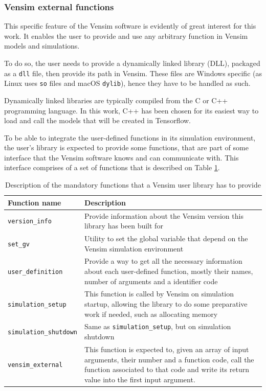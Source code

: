\subsubsection{Vensim external functions}

This specific feature of the Vensim software is evidently of great interest for this work. It enables the user to provide and use any arbitrary function in Vensim models and simulations.

To do so, the user needs to provide a dynamically linked library (DLL), packaged as a \texttt{dll} file, then provide its path in Vensim. These files are Windows specific (as Linux uses \texttt{so} files and macOS \texttt{dylib}), hence they have to be handled as such.

Dynamically linked libraries are typically compiled from the C or C++ programming language. In this work, C++ has been chosen for its easiest way to load and call the models that will be created in Tensorflow.

To be able to integrate the user-defined functions in its simulation environment, the user's library is expected to provide some functions, that are part of some interface that the Vensim software knows and can communicate with. This interface comprises of a set of functions that is described on Table \ref{table:vensim-interface}.
\begin{table}[h]
    \centering
    \begin{tabular}{|m{4.1cm}|m{12cm}|}
        \hline
        Function name & Description \\ \hline
        \texttt{version\_info} & Provide information about the Vensim version this library has been built for \\
        \texttt{set\_gv} & Utility to set the global variable that depend on the Vensim simulation environment \\
        \texttt{user\_definition} & Provide a way to get all the necessary information about each user-defined function, mostly their names, number of arguments and a identifier code \\
        \texttt{simulation\_setup} & This function is called by Vensim on simulation startup, allowing the library to do some preparative work if needed, such as allocating memory \\
        \texttt{simulation\_shutdown} & Same as \texttt{simulation\_setup}, but on simulation shutdown \\
        \texttt{vensim\_external} & This function is expected to, given an array of input arguments, their number and a function code, call the function associated to that code and write its return value into the first input argument.\\
        \hline
    \end{tabular}
    \caption{Description of the mandatory functions that a Vensim user library has to provide}
    \label{table:vensim-interface}
\end{table}

